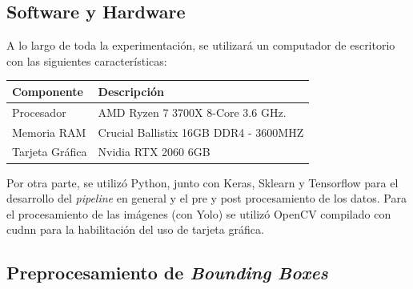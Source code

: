 \subsection{Software y Hardware}
A lo largo de toda la experimentación, se utilizará un computador de escritorio con las siguientes características:

\begin{table}[h!]
\centering
\footnotesize
\begin{tabular}{|l|l|}
\hline
\textbf{Componente} & \textbf{Descripción} \\ \hline
Procesador & AMD Ryzen 7 3700X 8-Core 3.6 GHz. \\ \hline
Memoria RAM & Crucial Ballistix 16GB DDR4 - 3600MHZ \\ \hline
Tarjeta Gráfica & Nvidia RTX 2060 6GB \\ \hline
\end{tabular}
\end{table}

Por otra parte, se utilizó Python, junto con Keras, Sklearn y Tensorflow 
para el desarrollo del \textit{pipeline} en general y el pre y post 
procesamiento de los datos. Para el procesamiento de las imágenes (con Yolo) 
se utilizó OpenCV compilado con cudnn para la habilitación del uso de tarjeta gráfica. 

\subsection{Preprocesamiento de \textit{Bounding Boxes}}

